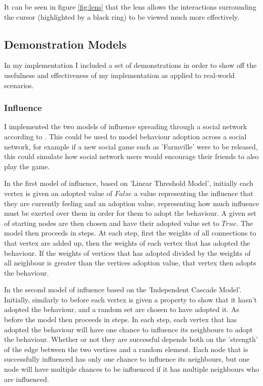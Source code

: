 \documentclass[12pt,a4paper]{article}
\begin{document}
It can be seen in figure \ref{fig:lens} that the lens allows the interactions surrounding the cursor (highlighted by a black ring) to be viewed much more effectively.

\subsection{Demonstration Models}

In my implementation I included a set of demonstrations in order to show off the usefulness and effectiveness of my implementation as applied to real-world scenarios.

\subsubsection{Influence}

I implemented the two models of influence spreading through a social network according to \cite{kempe2003maximizing}. This could be used to model behaviour adoption across a social network, for example if a new social game such as 'Farmville' were to be released, this could simulate how social network users would encourage their friends to also play the game.

In the first model of influence, based on 'Linear Threshold Model', initially each vertex is given an adopted value of $False$ a value representing the influence that they are currently feeling and an adoption value, representing how much influence must be exerted over them in order for them to adopt the behaviour. A given set of starting nodes are then chosen and have their adopted value set to $True$. The model then proceeds in steps. At each step, first the weights of all connections to that vertex are added up, then the weights of each vertex that has adopted the behaviour. If the weights of vertices that has adopted divided by the weights of all neighbour is greater than the vertices adoption value, that vertex then adopts the behaviour.

In the second model of influence based on the 'Independent Cascade Model'. Initially, similarly to before each vertex is given a property to show that it hasn't adopted the behaviour, and a random set are chosen to have adopted it. As before the model then proceeds in steps. In each step, each vertex that has adopted the behaviour will have one chance to influence its neighbours to adopt the behaviour. Whether or not they are successful depends both on the 'strength' of the edge between the two vertices and a random element. Each node that is successfully influenced has only one chance to influence its neighbours, but one node will have multiple chances to be influenced if it has multiple neighbours who are influenced.
\end{document}
